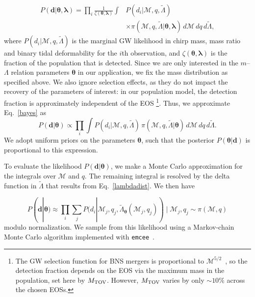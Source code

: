 \documentclass[aps,prl,twocolumn,superscriptaddress,footinbib]{revtex4-1}
\begin{document}
\begin{align} \label{bayes}
    P(\boldsymbol{d}|\boldsymbol{\theta},\boldsymbol{\lambda}) = \prod_i \frac{1}{\zeta(\boldsymbol{\theta},\boldsymbol{\lambda})} \int& P(d_i | \mathcal{M},q,\tilde{\Lambda}) \nonumber \\ 
    &\times \pi(\mathcal{M},q,\tilde{\Lambda} | \boldsymbol{\theta},\boldsymbol{\lambda}) \,d\mathcal{M}\, dq\, d\tilde{\Lambda} ,
\end{align}
where $P(d_i|\mathcal{M},q,\tilde{\Lambda})$ is the marginal GW likelihood in chirp mass, mass ratio and binary tidal deformability for the $i$th observation, and $\zeta(\boldsymbol{\theta},\boldsymbol{\lambda})$ is the fraction of the population that is detected. Since we are only interested in the $m$--$\Lambda$ relation parameters $\boldsymbol{\theta}$ in our application, we fix the mass distribution as specified above. We also ignore selection effects, as they do not impact the recovery of the parameters of interest: in our population model, the detection fraction is approximately independent of the EOS \footnote{The GW selection function for BNS mergers is proportional to $\mathcal{M}^{5/2}$~\cite{ChatziioannouFarr2020}, so the detection fraction depends on the EOS via the maximum mass in the population, set here by $M_{\rm TOV}$. However, $M_{\rm TOV}$ varies by only $\sim10\%$ across the chosen EOSs.}.
Thus, we approximate Eq.~\eqref{bayes} as
\begin{equation}
    P(\boldsymbol{d}|\boldsymbol{\theta}) \propto \prod_i \int P(d_i | \mathcal{M},q,\tilde{\Lambda}) \, \pi(\mathcal{M},q,\tilde{\Lambda} | \boldsymbol{\theta}) \, d\mathcal{M} \, dq \, d\tilde{\Lambda} .
\end{equation}
We adopt uniform priors on the parameters $\boldsymbol{\theta}$, such that the posterior $P(\boldsymbol{\theta}|\boldsymbol{d})$ is proportional to this expression.

To evaluate the likelihood $P(\boldsymbol{d}|\boldsymbol{\theta})$, we make a Monte Carlo approximation for the integrals over $\mathcal{M}$ and $q$. The remaining integral is resolved by the delta function in $\tilde{\Lambda}$ that results from Eq.~\eqref{lambdadist}. We then have

\begin{equation}
    P(\boldsymbol{d}|\boldsymbol{\theta}) \approx \prod_i \sum_j P(d_i | \mathcal{M}_j,q_j,\tilde{\Lambda}_{\boldsymbol{\theta}}(\mathcal{M}_j,q_j)) \; | \; \mathcal{M}_j, q_j \sim \pi(\mathcal{M},q)
\end{equation}
modulo normalization. We sample from this likelihood using a Markov-chain Monte Carlo algorithm implemented with \texttt{emcee}~\cite{Foreman-MackeyHogg2013}.
\end{document}
